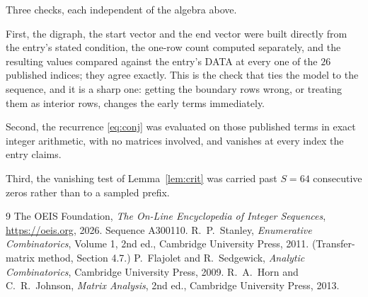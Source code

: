 \documentclass[11pt,a4paper]{article}
\theoremstyle{plain}
\theoremstyle{definition}
\begin{document}
Three checks, each independent of the algebra above.

First, the digraph, the start vector and the end vector were built directly from the
entry's stated condition, the one-row count computed separately, and the resulting values
compared against the entry's DATA at every one of the $26$ published indices; they
agree exactly. This is the check that ties the model to the sequence, and it is a sharp one:
getting the boundary rows wrong, or treating them as interior rows, changes the early terms
immediately.

Second, the recurrence \eqref{eq:conj} was evaluated on those published terms in exact
integer arithmetic, with no matrices involved, and vanishes at every index the entry claims.

Third, the vanishing test of Lemma~\ref{lem:crit} was carried past $S=64$ consecutive
zeros rather than to a sampled prefix.

\begin{thebibliography}{9}
 The OEIS Foundation, \emph{The On-Line Encyclopedia of Integer
Sequences}, \url{https://oeis.org}, 2026. Sequence A300110.
 R.~P.~Stanley, \emph{Enumerative Combinatorics}, Volume 1, 2nd ed.,
Cambridge University Press, 2011. (Transfer-matrix method, Section 4.7.)
 P.~Flajolet and R.~Sedgewick, \emph{Analytic Combinatorics}, Cambridge
University Press, 2009.
 R.~A.~Horn and C.~R.~Johnson, \emph{Matrix Analysis}, 2nd ed., Cambridge
University Press, 2013.
\end{thebibliography}
\end{document}
